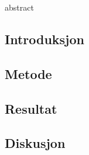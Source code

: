 \documentclass {article}
\begin{document}
 {abstract}

\subsection {Introduksjon}

\subsection {Metode}

\subsection {Resultat}

\subsection {Diskusjon}
\end{document}

